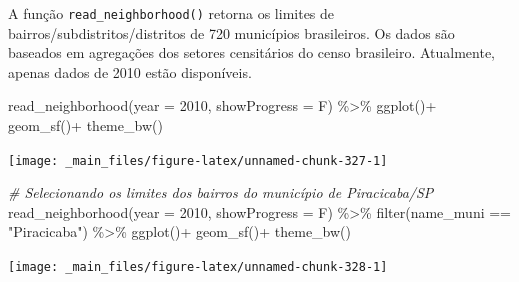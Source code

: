\documentclass[
  brazilian,
]{book}
\newenvironment{Shaded}{\begin{snugshade}}{\end{snugshade}}
\newcommand{\AttributeTok}[1]{\textcolor[rgb]{0.77,0.63,0.00}{#1}}
\newcommand{\CommentTok}[1]{\textcolor[rgb]{0.56,0.35,0.01}{\textit{#1}}}
\newcommand{\DecValTok}[1]{\textcolor[rgb]{0.00,0.00,0.81}{#1}}
\newcommand{\FunctionTok}[1]{\textcolor[rgb]{0.00,0.00,0.00}{#1}}
\newcommand{\NormalTok}[1]{#1}
\newcommand{\SpecialCharTok}[1]{\textcolor[rgb]{0.00,0.00,0.00}{#1}}
\newcommand{\StringTok}[1]{\textcolor[rgb]{0.31,0.60,0.02}{#1}}
\begin{document}
A função \texttt{read\_neighborhood()} retorna os limites de bairros/subdistritos/distritos de 720 municípios brasileiros. Os dados são baseados em agregações dos setores censitários do censo brasileiro. Atualmente, apenas dados de 2010 estão disponíveis.

\begin{Shaded}
\begin{Highlighting}[]
\FunctionTok{read\_neighborhood}\NormalTok{(}\AttributeTok{year =} \DecValTok{2010}\NormalTok{,}
                  \AttributeTok{showProgress =}\NormalTok{ F) }\SpecialCharTok{\%\textgreater{}\%} 
  \FunctionTok{ggplot}\NormalTok{()}\SpecialCharTok{+}
  \FunctionTok{geom\_sf}\NormalTok{()}\SpecialCharTok{+}
  \FunctionTok{theme\_bw}\NormalTok{()}
\end{Highlighting}
\end{Shaded}

\begin{center}\texttt{[image: \_main\_files/figure-latex/unnamed-chunk-327-1]} \end{center}

\begin{Shaded}
\begin{Highlighting}[]
\CommentTok{\# Selecionando os limites dos bairros do município de Piracicaba/SP}
\FunctionTok{read\_neighborhood}\NormalTok{(}\AttributeTok{year =} \DecValTok{2010}\NormalTok{,}
                  \AttributeTok{showProgress =}\NormalTok{ F) }\SpecialCharTok{\%\textgreater{}\%} 
  \FunctionTok{filter}\NormalTok{(name\_muni }\SpecialCharTok{==} \StringTok{"Piracicaba"}\NormalTok{) }\SpecialCharTok{\%\textgreater{}\%}
  \FunctionTok{ggplot}\NormalTok{()}\SpecialCharTok{+}
  \FunctionTok{geom\_sf}\NormalTok{()}\SpecialCharTok{+}
  \FunctionTok{theme\_bw}\NormalTok{()}
\end{Highlighting}
\end{Shaded}

\begin{center}\texttt{[image: \_main\_files/figure-latex/unnamed-chunk-328-1]} \end{center}
\end{document}
